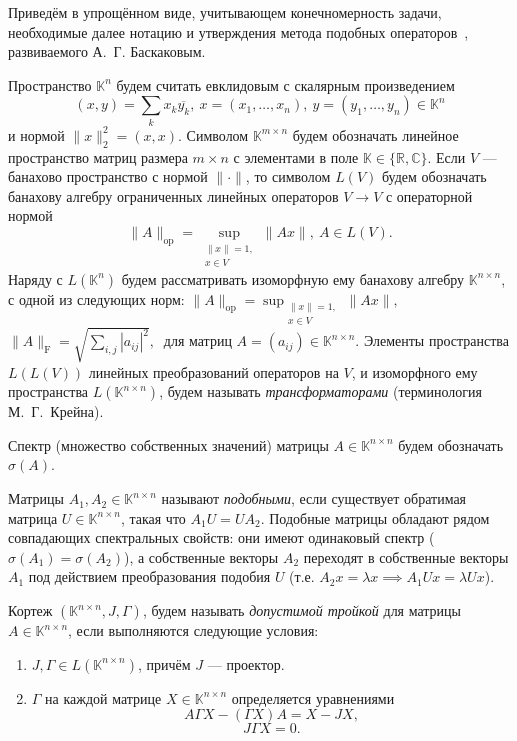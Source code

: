Приведём в упрощённом виде, учитывающем конечномерность задачи,
    необходимые далее нотацию и утверждения
    метода подобных операторов~\cite{baskakov-harmonic,baskakov1983},
    развиваемого А.~Г. Баскаковым.


Пространство \( \mathbb{K}^n \) 
    будем считать евклидовым с скалярным произведением
    \[
        (x, y){=}\sum_k x_k\overline{y_k},
        \ x{=}(x_1,\ldots, x_n),
        \ y=(y_1,\ldots, y_n)
        \in \mathbb{K}^n
        \]
    и нормой
    \(
        \|x\|_2^2{=}(x,x).
        \)
Символом \( \mathbb{K}^{m\times n} \)
    будем обозначать линейное пространство
    матриц размера \( m{\times}n \)
    с элементами в поле \( \mathbb{K}\in\{\mathbb{R},\mathbb{C}\} \).
Если \( V \) --- банахово пространство с нормой \( \|\cdot\| \),
    то символом \( L(V) \)
    будем обозначать банахову алгебру
    ограниченных линейных операторов \( V\to V \)
    с операторной нормой
\[
    \|A\|_{\mathrm{op}} = \sup_{\substack{\|x\|=1,\\ x\in V}} \|A x\|,\ A\in L(V).
    \]
Наряду с \( L(\mathbb{K}^n) \)
    будем рассматривать изоморфную ему
    банахову алгебру \( \mathbb{K}^{n\times n} \),
    с одной из следующих норм:
    \( \|A\|_{\mathrm{op}} = \sup_{\substack{\|x\|=1,\\ x\in V}} \|A x\|,\ \)
    \( \|A\|_{\mathrm{F}} = \sqrt{\sum_{i,j} |a_{ij}|^2},\ \)
    для матриц \( A{=}(a_{ij})\in\mathbb{K}^{n\times n} \).
Элементы пространства
    \( L(L(V)) \)
    линейных преобразований операторов на \( V \),
    и изоморфного ему пространства \( L(\mathbb{K}^{n\times n}) \),
    будем называть \emph{трансформаторами}
    (терминология М.~Г.~Крейна).

Спектр (множество собственных значений)
    матрицы \( A\in\mathbb{K}^{n\times n} \)
    будем обозначать \( \sigma(A) \).

Матрицы \( A_1, A_2 \in \mathbb{K}^{n\times n} \)
    называют \emph{подобными}, если существует
    обратимая матрица \( U\in\mathbb{K}^{n\times n} \),
    такая что \( A_1 U = U A_2 \).
Подобные матрицы обладают рядом совпадающих спектральных свойств:
    они имеют одинаковый спектр (\( \sigma(A_1)=\sigma(A_2) \)),
    а собственные векторы \( A_2 \) переходят
    в собственные векторы \( A_1 \) под действием
    преобразования подобия \( U \)
    (т.е. \( A_2 x = \lambda x \implies A_1 U x = \lambda U x \)).

Кортеж \( (\mathbb{K}^{n{\times}n}, J, \Gamma) \),
    будем называть \emph{допустимой тройкой}
    для матрицы \( A\in\mathbb{K}^{n\times n} \),
    если выполняются следующие условия:
\begin{enumerate}
\item
    \( J,\Gamma\in L(\mathbb{K}^{n{\times}n}) \),
    причём \( J \) --- проектор.
\item
    \( \Gamma \) на каждой матрице \( X\in \mathbb{K}^{n\times n} \)
    определяется уравнениями
    \[ A\Gamma X - (\Gamma X) A = X - JX, \]
    \[ J\Gamma X = 0. \]
\end{enumerate}

